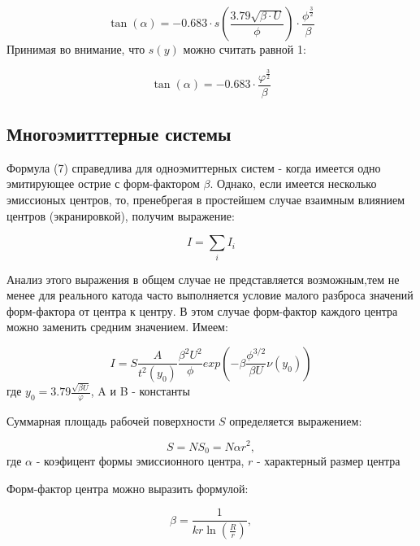 \documentclass[12pt,a4paper]{article}
\begin{document}
\begin{equation}
\tan(\alpha)=-0.683\cdot s(\frac{3.79 \sqrt{\beta \cdot U}}{\phi}) \cdot \frac{\phi^{\frac{3}{2}}}{\beta}
\end{equation}
Принимая во внимание, что $s(y)$ можно считать равной 1:

\begin{equation}
\tan(\alpha) = -0.683 \cdot \frac{\varphi ^{\frac{3}{2}}}{\beta}
\end{equation}

\subsection{Многоэмитттерные системы}


Формула (7) справедлива для одноэмиттерных систем - когда имеется одно эмитирующее острие с форм-фактором $\beta$. Однако, если имеется несколько эмиссионых центров, то, пренебрегая в простейшем случае взаимным влиянием центров (экранировкой), получим выражение:

\begin{equation*}
I = \sum_i I_i
\end{equation*}


Анализ этого выражения в общем случае не представляется возможным,тем не менее для реального катода часто выполняется условие малого разброса значений форм-фактора от центра к центру. В этом случае форм-фактор каждого центра можно заменить средним значением. Имеем:

\begin{equation}
I = S \frac{A}{t^2(y_0)} \frac{\beta^2 U^2}{\phi} exp (-\beta \frac{\phi^{3/2}}{\beta U} \nu (y_0))
\end{equation}
где $y_0 = 3.79\frac{\sqrt{\beta U}}{\varphi}$, A  и B - константы

Суммарная площадь рабочей поверхности $S$ определяется выражением:

\begin{equation*}
S = N S_0 = N \alpha r^2,
\end{equation*}
где $\alpha$ - коэфицент формы эмиссионного центра, $r$ - характерный размер центра

Форм-фактор центра можно выразить формулой:

\begin{equation}
\beta = \frac{1}{kr \ln(\frac{R}{r})},
\end{equation}
\end{document}
